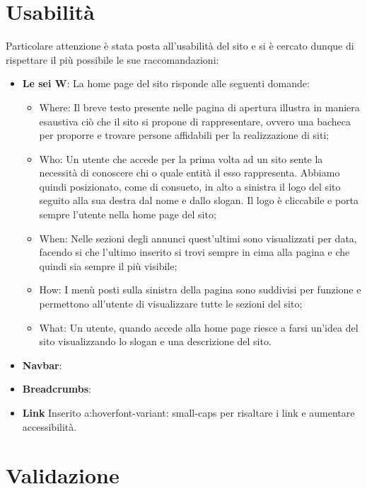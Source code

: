 \documentclass[12pt]{article}
\begin{document}
		
		
\section{Usabilità}
Particolare attenzione è stata posta all’usabilità del sito e si è cercato dunque di rispettare il più possibile le sue raccomandazioni:

\begin{itemize}
\item \textbf{Le sei W}: La home page del sito risponde alle seguenti domande:

\begin{itemize}
\item Where: Il breve testo presente nelle pagina di apertura illustra in maniera esaustiva ciò che il sito si propone di rappresentare, ovvero una bacheca per proporre e trovare persone affidabili per la realizzazione di siti;
\item Who: Un utente che accede per la prima volta ad un sito sente la necessità di conoscere chi o quale entità il esso rappresenta. Abbiamo quindi posizionato, come di consueto, in alto a sinistra il logo del sito seguito alla sua destra dal nome e dallo slogan. Il logo è cliccabile e porta sempre l'utente nella home page del sito;
\item When: Nelle sezioni degli annunci quest'ultimi sono visualizzati per data, facendo si che l'ultimo inserito si trovi sempre in cima alla pagina e che quindi sia sempre il più visibile;
\item How: I menù posti sulla sinistra della pagina sono suddivisi per funzione e permettono all'utente di visualizzare tutte le sezioni del sito;
\item What: Un utente, quando accede alla home page riesce a farsi un’idea del sito visualizzando lo slogan e una descrizione del sito.
\end{itemize}

\item \textbf{Navbar}:

\item \textbf{Breadcrumbs}:

\item \textbf{Link}
Inserito a:hover{font-variant: small-caps} per risaltare i link e aumentare accessibilità.


\end{itemize}

		
\section{Validazione}
\end{document}
